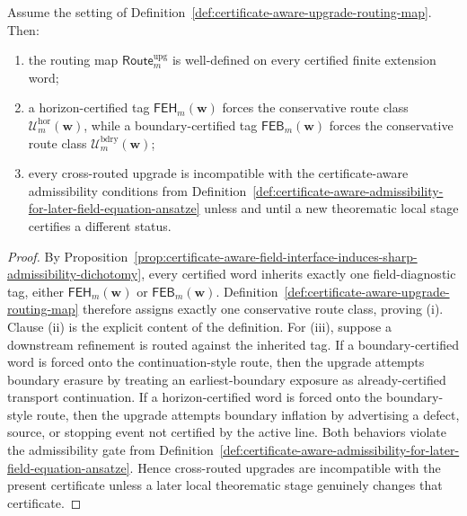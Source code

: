 \begin{proposition}
\label{prop:inherited-field-diagnostic-tag-forces-unique-conservative-upgrade-route}
Assume the setting of Definition~\ref{def:certificate-aware-upgrade-routing-map}. Then:
\begin{enumerate}[label=(\roman*)]
 \item the routing map \(\mathsf{Route}^{\mathrm{upg}}_{m}\) is well-defined on every certified finite extension word;
 \item a horizon-certified tag \(\mathsf{FEH}_{m}(\mathbf w)\) forces the conservative route class \(\mathcal U^{\mathrm{hor}}_{m}(\mathbf w)\), while a boundary-certified tag \(\mathsf{FEB}_{m}(\mathbf w)\) forces the conservative route class \(\mathcal U^{\mathrm{bdry}}_{m}(\mathbf w)\);
 \item every cross-routed upgrade is incompatible with the certificate-aware admissibility conditions from Definition~\ref{def:certificate-aware-admissibility-for-later-field-equation-ansatze} unless and until a new theorematic local stage certifies a different status.
\end{enumerate}
\end{proposition}

\begin{proof}
By Proposition~\ref{prop:certificate-aware-field-interface-induces-sharp-admissibility-dichotomy}, every certified word inherits exactly one field-diagnostic tag, either \(\mathsf{FEH}_{m}(\mathbf w)\) or \(\mathsf{FEB}_{m}(\mathbf w)\). Definition~\ref{def:certificate-aware-upgrade-routing-map} therefore assigns exactly one conservative route class, proving (i). Clause (ii) is the explicit content of the definition. For (iii), suppose a downstream refinement is routed against the inherited tag. If a boundary-certified word is forced onto the continuation-style route, then the upgrade attempts boundary erasure by treating an earliest-boundary exposure as already-certified transport continuation. If a horizon-certified word is forced onto the boundary-style route, then the upgrade attempts boundary inflation by advertising a defect, source, or stopping event not certified by the active line. Both behaviors violate the admissibility gate from Definition~\ref{def:certificate-aware-admissibility-for-later-field-equation-ansatze}. Hence cross-routed upgrades are incompatible with the present certificate unless a later local theorematic stage genuinely changes that certificate.
\end{proof}

